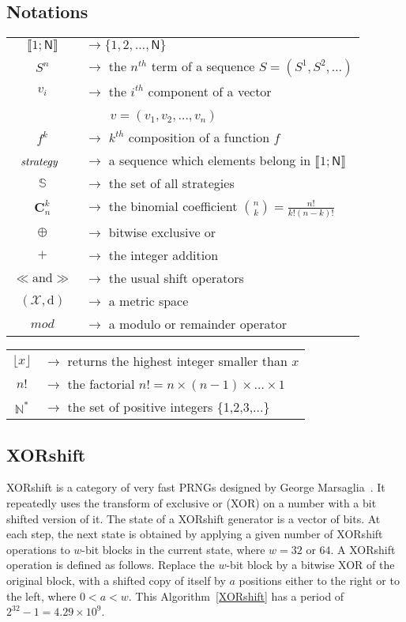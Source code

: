 \documentclass[journal]{IEEEtran}
\begin{document}
\subsection{Notations}
\begin{tabular}{@{}c@{}@{}l@{}}
$\llbracket 1;\mathsf{N} \rrbracket$ & $\rightarrow\{1,2,\hdots,\mathsf{N}\}$ \\
$S^{n}$ & $\rightarrow$ the $n^{th}$ term of a sequence $S=(S^{1},S^{2},\hdots)$ \\
$v_{i}$ & $\rightarrow$ the $i^{th}$ component of a vector \\
&~~~~$v=(v_{1},v_{2},\hdots, v_n)$\\
$f^{k}$ & $\rightarrow$ $k^{th}$ composition of a function $f$ \\
$\emph{strategy}$~ & $\rightarrow$ a sequence which elements belong in $\llbracket 1;\mathsf{N} \rrbracket $ \\
$\mathbb{S}$ & $\rightarrow$ the set of all strategies \\
$\mathbf{C}_n^k$ & $\rightarrow$ the binomial coefficient ${n \choose k} = \frac{n!}{k!(n-k)!}$\\
$\oplus$ & $\rightarrow$ bitwise exclusive or \\
$+$ & $\rightarrow$ the integer addition \\
$\ll \text{and} \gg$ & $\rightarrow$ the usual shift operators \\
$(\mathcal{X}, \text{d})$ & $\rightarrow$ a metric space \\
$mod$ & $\rightarrow$ a modulo or remainder operator
\end{tabular}

\begin{tabular}{@{}c@{}@{}l@{}}




$\lfloor x \rfloor$ & $\rightarrow$ returns the highest integer smaller than $x$ \\
$n!$ & $\rightarrow$ the factorial $n!=n\times(n-1)\times\dots\times1$\\
$\mathds{N}^{\ast }$ & $\rightarrow$ the set of positive integers \{1,2,3,...\}
\end{tabular}



\subsection{XORshift}

XORshift is a category of very fast PRNGs designed by George Marsaglia~\cite{Marsaglia2003}.
It repeatedly uses the transform of exclusive or (XOR) on a number with a bit shifted version of it. The state of a XORshift generator is a vector of bits. At each step, the next state is obtained by applying a given number of XORshift operations to $w$-bit blocks in the current state, where $w = 32$ or $64$. A XORshift operation is defined as follows. Replace the $w$-bit block by a bitwise XOR of the original block, with a shifted copy of itself by $a$ positions either to the right or to the left, where $ 0 < a < w$. This Algorithm~\ref{XORshift} has a period of $2^{32}-1=4.29\times10^9$.
\end{document}
